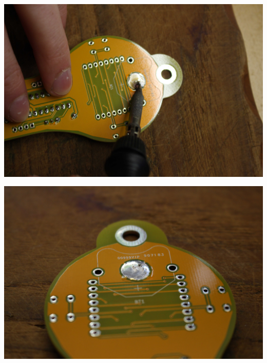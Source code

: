 \documentclass{article}
\begin{document}
\vspace{0.5cm}

\begin{minipage}[b]{0.5\textwidth}
	\includegraphics[width=\textwidth]{Bilder/IMG_5563.JPG}
\end{minipage}
\begin{minipage}[b]{0.5\textwidth}
	\includegraphics[width=\textwidth]{Bilder/IMG_5564.JPG}
\end{minipage}

\vspace{0.5cm}
\end{document}
